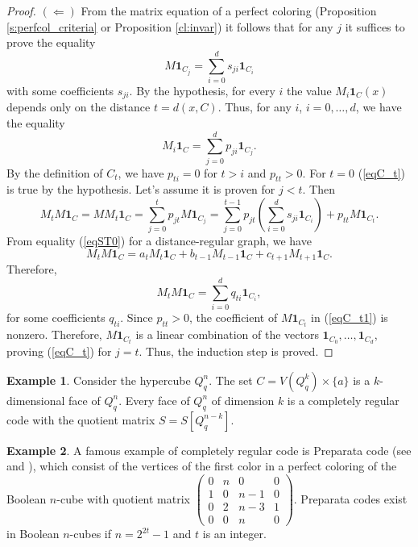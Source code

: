 \documentclass[11pt]{article}
\theoremstyle{definition}
\newtheorem{example}{Example}[section]
\begin{document}
{{{\begin{proof}
$(\Leftarrow)$ From the matrix equation of a perfect coloring
(Proposition \ref{s:perfcol_criteria} or Proposition \ref{cl:invar}) it follows that for any $j$
it suffices to prove the equality
\begin{equation}\label{eqC_t}
M\mathbf{1}_{C_j}=\sum\limits_{i=0}^ds_{ji}\mathbf{1}_{C_i}
\end{equation}
with some coefficients $s_{ji}$. By the hypothesis, for every $i$ the value 
$M_i\mathbf{1}_{C}(x)$ depends only on  the distance $t=d(x,C)$. Thus, for any $i$, $i=0,\dots,d$, we have the equality
$$M_i\mathbf{1}_{C}=\sum\limits_{j=0}^dp_{ji}\mathbf{1}_{C_j}.$$
By the definition of $C_t$, we have $p_{ti}=0$ for $t>i$ and $p_{tt}>0$.
For $t=0$ (\ref{eqC_t}) is true  by the hypothesis.
Let's assume it is proven for $j<t$. Then
\begin{equation}\label{eqC_t1}
M_{t}M{\mathbf 1}_{C}=MM_{t}\mathbf{1}_{C}=\sum\limits_{j=0}^{t}p_{jt}M\mathbf{1}_{C_j}=
\sum\limits_{j=0}^{t-1}p_{jt}\left(\sum\limits_{i=0}^ds_{ji}{\mathbf 1}_{C_i}\right)+
p_{tt}M\mathbf{1}_{C_t}.
\end{equation}
From equality (\ref{eqST0}) for a
distance-regular graph, we have
$$M_t M\mathbf{1}_{C}= a_tM_t\mathbf{1}_{C}
+b_{t-1}M_{t-1}\mathbf{1}_{C}+c_{t+1}M_{t+1}\mathbf{1}_{C}.$$
Therefore,
$$M_{t}M\mathbf{1}_{C}=\sum\limits_{i=0}^dq_{ti}\mathbf{1}_{C_i},$$
for some coefficients $q_{ti}$. 
 Since $p_{tt}>0$, the coefficient of
$M{\mathbf 1}_{C_t}$ in (\ref{eqC_t1}) is nonzero.
Therefore, $M\mathbf{1}_{C_t}$ is a linear combination of the vectors
${\mathbf 1}_{C_0},\dots,\mathbf{1}_{C_d}$, proving (\ref{eqC_t}) for $j=t$.
Thus, the induction step
is proved. \end{proof}
{
\begin{example}\label{ex:face0}
Consider the hypercube $Q^n_q$.
The set $C=V(Q^{k}_q)\times \{a\}$ is a $k$-dimensional
face of  $Q^n_q$. Every face of $Q^n_q$
of dimension $k$ is a completely regular code with the quotient matrix
 $S=S[Q^{n-k}_q]$.
\end{example}}


{
\begin{example}\label{ex:face}
A famous example of completely regular code is Preparata code (see \cite{Preparata} and
\cite{Lint}), which consist of the vertices of the first color in a perfect
coloring of the Boolean $n$-cube with quotient matrix $\begin{pmatrix}
0 & n & 0 & 0 \\
1 & 0 & n-1 & 0\\
0 & 2 & n-3 & 1\\
0 & 0 & n & 0
\end{pmatrix}$. Preparata codes exist in Boolean $n$-cubes  if
 $n=2^{2t}-1$ and $t$ is an integer.
\end{example}}


}}}
\end{document}

